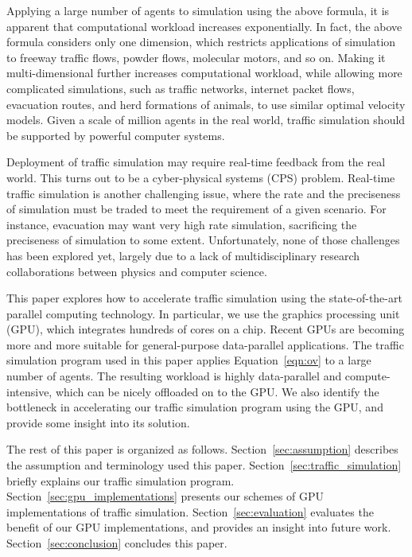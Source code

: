 \documentclass[times, 10pt, twocolumn]{article}
\begin{document}
Applying a large number of agents to simulation using the above formula,
it is apparent that computational workload increases exponentially.
In fact, the above formula considers only one dimension, which restricts
applications of simulation to freeway traffic flows, powder flows,
molecular motors, and so on.
Making it multi-dimensional further increases computational workload,
while allowing more complicated simulations, such as traffic networks,
internet packet flows, evacuation routes, and herd formations of
animals, to use similar optimal velocity models.
Given a scale of million agents in the real world, traffic
simulation should be supported by powerful computer systems.

Deployment of traffic simulation may require real-time feedback from the
real world.
This turns out to be a cyber-physical systems (CPS) problem.
Real-time traffic simulation is another challenging issue, where
the rate and the preciseness of simulation must be traded to meet the
requirement of a given scenario.
For instance, evacuation may want very high rate simulation, sacrificing
the preciseness of simulation to some extent.
Unfortunately, none of those challenges has been explored yet, largely
due to a lack of multidisciplinary research collaborations between physics
and computer science.

This paper explores how to accelerate traffic simulation using the
state-of-the-art parallel computing technology.
In particular, we use the graphics processing unit (GPU), which
integrates hundreds of cores on a chip.
Recent GPUs are becoming more and more suitable for general-purpose
data-parallel applications.
The traffic simulation program used in this paper applies
Equation~\eqref{eqn:ov} to a large number of agents.
The resulting workload is highly data-parallel and compute-intensive,
which can be nicely offloaded on to the GPU.
We also identify the bottleneck in accelerating our traffic simulation
program using the GPU, and provide some insight into its solution.

The rest of this paper is organized as follows.
Section~\ref{sec:assumption} describes the assumption and terminology
used this paper.
Section~\ref{sec:traffic_simulation} briefly explains our traffic
simulation program.
Section~\ref{sec:gpu_implementations} presents our schemes of GPU
implementations of traffic simulation.
Section~\ref{sec:evaluation} evaluates the benefit of our GPU
implementations, and provides an insight into future work.
Section~\ref{sec:conclusion} concludes this paper.
\end{document}
